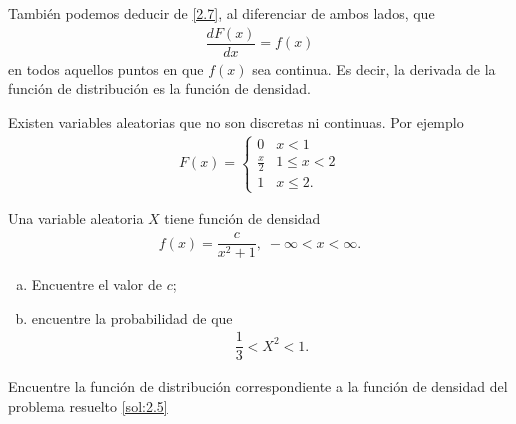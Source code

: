 	También podemos deducir de \eqref{2.7}, al diferenciar de ambos lados, que
	\begin{align}
		\label{2.11}
		\dfrac{dF(x)}{dx} = f(x)
	\end{align}
en todos aquellos puntos en que $f(x)$ sea continua.  Es decir, la derivada de la función de distribución es la función de densidad.


	\begin{rem}
		Existen variables aleatorias que no son discretas ni continuas.  Por ejemplo
		\begin{align}
			F(x)=
			\begin{cases}
				0 & x <1 \\
				\frac{x}{2} & 1 \leq x < 2 \\
				1 & x \leq 2.
			\end{cases}
		\end{align}

	\end{rem}



 \begin{ejemplo}
  \label{sol:2.5} Una variable aleatoria $X$ tiene función de densidad
  \begin{align}
   f(x)=\dfrac{c}{x^{2}+1}, \; -\infty < x <\infty.
  \end{align}

  \begin{enumerate}[(a)]
   \item Encuentre el valor de $c$; 
   \item encuentre la probabilidad de que
   \begin{align*}
    \dfrac{1}{3}< X^{2} <1.
   \end{align*}

  \end{enumerate}

 \end{ejemplo}



 \begin{ejemplo}
  \label{sol:2.6}
  Encuentre la función de distribución correspondiente a la función de densidad del problema resuelto \ref{sol:2.5}
 \end{ejemplo}



